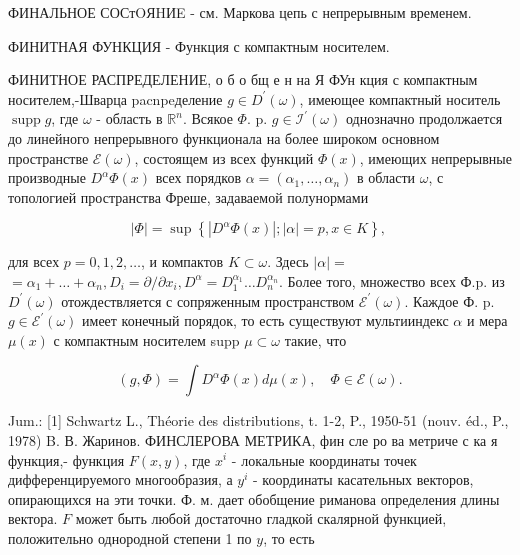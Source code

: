 \documentclass[10pt]{article}
\begin{document}
ФИНАЛЬНОЕ СОСтOЯHИE - см. Маркова цепь с непрерывным временем.



ФИНИТНАЯ ФУНКЦИЯ - Функция с компактным носителем.



ФИНИТНОЕ РАСПРЕДЕЛЕНИЕ, о б о бщ е н на Я ФУн кция с компактным носителем,-Шварца pacnpeделение $g \in D^{\prime}(\omega)$, имеющее компактный носитель $\operatorname{supp} g$, где $\omega$ - область в $\mathbb{R}^{n}$. Всякое $\Phi$. p. $g \in \mathscr{I}^{\prime}(\omega)$ однозначно продолжается до линейного непрерывного функционала на более широком основном пространстве $\mathscr{E}(\omega)$, состоящем из всех функций $\Phi(x)$, имеющих непрерывные производные $D^{\alpha} \Phi(x)$ всех порядков $\alpha=\left(\alpha_{1}, \ldots, \alpha_{n}\right)$ в области $\omega$, с топологией пространства Фреше, задаваемой полунормами



\[

|\Phi|=\sup \left\{\left|D^{\alpha} \Phi(x)\right| ;|\alpha|=p, x \in K\right\} \text {, }

\]



для всех $p=0,1,2, \ldots$, и компактов $K \subset \omega$. Здесь $|\alpha|=$ $=\alpha_{1}+\ldots+\alpha_{n}, D_{i}=\partial / \partial x_{i}, D^{\alpha}=D_{1}^{\alpha_{1}} \ldots D_{n}^{\alpha_{n}}$. Более того, множество всех Ф.p. из $D^{\prime}(\omega)$ отождествляется с сопряженным пространством $\mathcal{E}^{\prime}(\omega)$. Каждое Ф. p. $g \in \mathscr{E}^{\prime}(\omega)$ имеет конечный порядок, то есть существуют мультииндекс $\alpha$ и мера $\mu(x)$ с компактным носителем supp $\mu \subset \omega$ такие, что



\[

(g, \Phi)=\int D^{\alpha} \Phi(x) d \mu(x), \quad \Phi \in \mathscr{E}(\omega) .

\]



Jum.: [1] Schwartz L., Théorie des distributions, t. 1-2, P., 1950-51 (nouv. éd., P., 1978) B. В. Жаринов. ФИНСЛЕРОВА МЕТРИКА, фин сле ро ва метриче с ка я функция,- функция $F(x, y)$, где $x^{i}$ - локальные координаты точек дифференцируемого многообразия, а $y^{i}$ - координаты касательных векторов, опирающихся на эти точки. Ф. м. дает обобщение риманова определения длины вектора. $F$ может быть любой достаточно гладкой скалярной функцией, положительно однородной степени 1 по $y$, то есть
\end{document}
